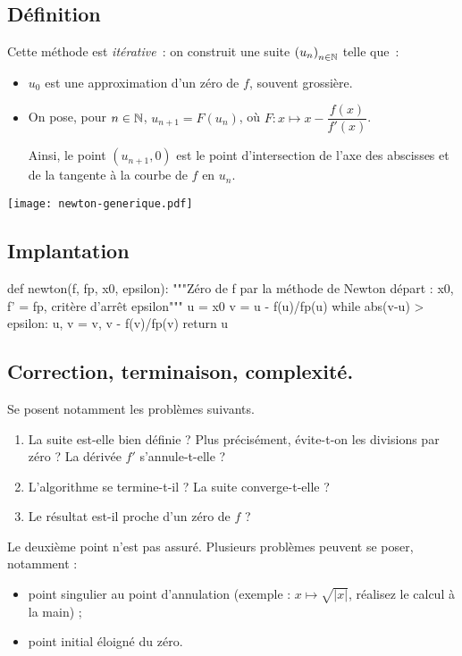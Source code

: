 \subsection{Définition}

Cette méthode est \emph{itérative}~: on construit une suite $\left(u_{n}\right)_{n\in\mathbb{N}}$ telle que~:
\begin{itemize}
\item $u_{0}$ est une approximation d'un zéro de $f$, souvent grossière.
\item On pose, pour $n\in\mathbb{N}$, $u_{n+1}=F(u_{n})$, où 
  $F : x\mapsto x - \dfrac{f(x)}{f'(x)}$.
  
Ainsi, le point $(u_{n+1},0)$ est le point d'intersection de l'axe des abscisses et de la 
tangente à la courbe de $f$ en $u_n$.
\end{itemize}
\begin{center}
 \texttt{[image: newton-generique.pdf]}
\end{center}
\subsection{Implantation}
\begin{pyverbatim}
def newton(f, fp, x0, epsilon):
    """Zéro de f par la méthode de Newton
       départ : x0, f' = fp, critère d'arrêt epsilon"""
    u = x0
    v = u - f(u)/fp(u)
    while abs(v-u) > epsilon:
        u, v = v, v - f(v)/fp(v)
    return u
\end{pyverbatim}
\subsection{Correction, terminaison, complexité.}

Se posent notamment les problèmes suivants.
\begin{enumerate}
\item La suite est-elle bien définie ? Plus précisément, évite-t-on les divisions par zéro ? La dérivée $f'$ 
s'annule-t-elle ?
\item L'algorithme se termine-t-il ? La suite converge-t-elle ? 
\item Le résultat est-il proche d'un zéro de $f$ ?
\end{enumerate}

\begin{rem}
  Le deuxième point n'est pas assuré. Plusieurs problèmes peuvent se poser, notamment : 
  \begin{itemize}
    \item point singulier au point d'annulation (exemple : $x\mapsto\sqrt{|x|}$, réalisez le calcul à la main) ;
    \item point initial éloigné du zéro.
  \end{itemize}
\end{rem}


